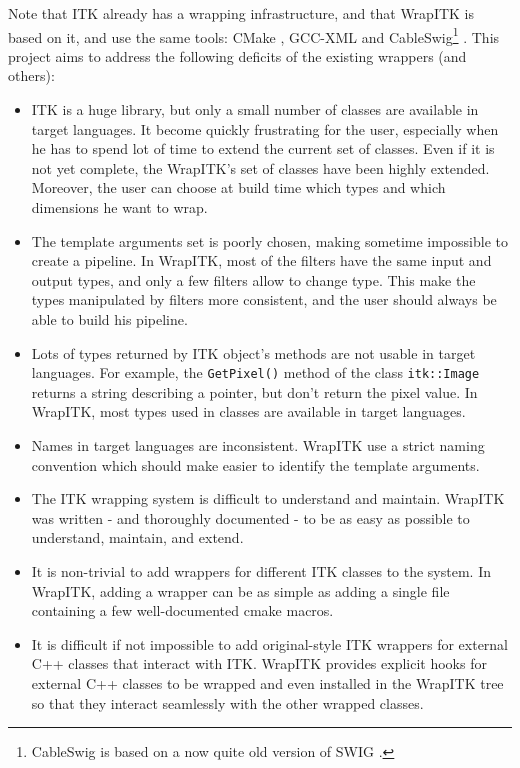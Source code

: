 \documentclass{InsightArticle}
\begin{document}
Note that ITK already has a wrapping infrastructure, and that WrapITK is based
on it, and use the same tools: CMake \cite{CMakeWebSite}, GCC-XML \cite{GccxmlWebsite}
and CableSwig\footnote{CableSwig is based on a now quite old version of SWIG
\cite{SwigWebSite}.} \cite{CableSwigWebSite}. This project aims to
address the following deficits of the existing wrappers (and others):
\begin{itemize}
  \item  ITK is a huge library, but only a small number of classes are available
in target languages. It become quickly frustrating for the user, especially when
he has to spend lot of time to extend the current set of classes. Even if it is
not yet complete, the WrapITK's set of classes have been highly extended. Moreover,
the user can choose at build time which types and which dimensions he want to wrap.

  \item  The template arguments set is poorly chosen, making sometime impossible
to create a pipeline. In WrapITK, most of the filters have the same input and output
types, and only a few filters allow to change type. This make the types manipulated 
by filters more consistent, and the user should always be able to build his pipeline.

  \item  Lots of types returned by ITK object's methods are not usable in target
languages. For example, the \verb$GetPixel()$ method of the class \verb$itk::Image$
returns a string describing a pointer, but don't return the pixel value. In WrapITK,
most types used in classes are available in target languages.

  \item  Names in target languages are inconsistent. WrapITK use a strict naming
convention which should make easier to identify the template arguments.

  \item  The ITK wrapping system is difficult to understand and maintain. WrapITK was
written - and thoroughly documented - to be as easy as possible to understand,
maintain, and extend.

  \item  It is non-trivial to add wrappers for different ITK classes to the system. In
WrapITK, adding a wrapper can be as simple as adding a single file containing a
few well-documented cmake macros.

  \item  It is difficult if not impossible to add original-style ITK wrappers for
external C++ classes that interact with ITK. WrapITK provides explicit hooks for
external C++ classes to be wrapped and even installed in the WrapITK tree so
that they interact seamlessly with the other wrapped classes.


\end{itemize}
\end{document}
